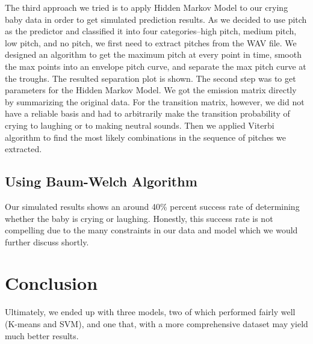 \documentclass[paper=a4, fontsize=11pt]{scrartcl}
\numberwithin{equation}{section}
\numberwithin{figure}{section}
\numberwithin{table}{section}
\begin{document}
The third approach we tried is to apply Hidden Markov Model to our crying baby data in order to get simulated prediction results. As we decided to use pitch as the predictor and classified it into four categories--high pitch, medium pitch, low pitch, and no pitch, we first need to extract pitches from the WAV file. We designed an algorithm to get the maximum pitch at every point in time, smooth the max points into an envelope pitch curve, and separate the max pitch curve at the troughs. The resulted separation plot is shown. The second step was to get parameters for the Hidden Markov Model. We got the emission matrix directly by summarizing the original data. For the transition matrix, however, we did not have a reliable basis and had to arbitrarily make the transition probability of crying to laughing or to making neutral sounds. Then we applied Viterbi algorithm to find the most likely combinations in the sequence of pitches we extracted.

\subsection{Using Baum-Welch Algorithm}

Our simulated results shows an around 40\% percent success rate of determining whether the baby is crying or laughing. Honestly, this success rate is not compelling due to the many constraints in our data and model which we would further discuss shortly.

\section{Conclusion}
Ultimately, we ended up with three models, two of which performed fairly well (K-means and SVM), and one that, with a more comprehensive dataset may yield much better results. 
\end{document}
